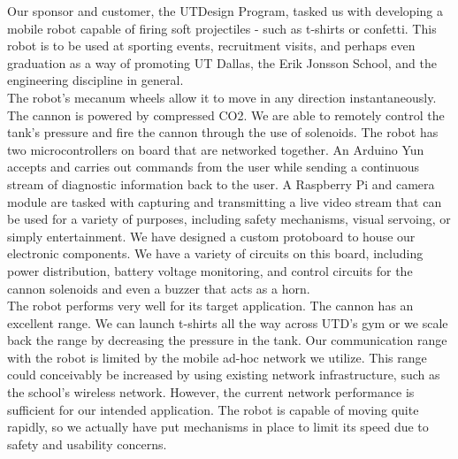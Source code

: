 \documentclass[letterpaper,12pt]{article}
\begin{document}
Our sponsor and customer, the UTDesign Program, tasked us with developing
a mobile robot capable of firing soft projectiles - such as t-shirts or
confetti. This robot is to be used at sporting events, recruitment visits, and
perhaps even graduation as a way of promoting UT Dallas, the Erik Jonsson
School, and the engineering discipline in general.\\

The robot's mecanum wheels allow it to move in any direction instantaneously.
The cannon is powered by compressed CO2. We are able to remotely control the
tank's pressure and fire the cannon through the use of solenoids. The robot has
two microcontrollers on board that are networked together. An Arduino Yun
accepts and carries out commands from the user while sending a continuous
stream of diagnostic information back to the user. A Raspberry Pi and camera
module are tasked with capturing and transmitting a live video stream that can
be used for a variety of purposes, including safety mechanisms, visual
servoing, or simply entertainment. We have designed a custom protoboard to
house our electronic components. We have a variety of circuits on this board,
including power distribution, battery voltage monitoring, and control circuits
for the cannon solenoids and even a buzzer that acts as a horn.\\

The robot performs very well for its target application. The cannon has an
excellent range. We can launch t-shirts all the way across UTD's gym or we
scale back the range by decreasing the pressure in the tank. Our communication
range with the robot is limited by the mobile ad-hoc network we utilize. This
range could conceivably be increased by using existing network infrastructure,
such as the school's wireless network. However, the current network performance
is sufficient for our intended application. The robot is capable of moving
quite rapidly, so we actually have put mechanisms in place to limit its speed
due to safety and usability concerns.
\end{document}
